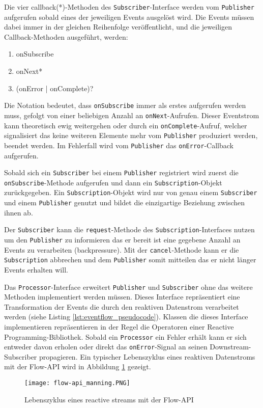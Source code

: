Die vier \gls{callback}(*)-Methoden des \verb|Subscriber|-Interface werden vom \verb|Publisher| aufgerufen sobald eines der jeweiligen Events ausgelöst wird.
Die Events müssen dabei immer in der gleichen Reihenfolge veröffentlicht, und die jeweiligen Callback-Methoden ausgeführt, werden:
\begin{enumerate}
  \item onSubscribe
  \item onNext*
  \item (onError | onComplete)?
\end{enumerate}
Die Notation bedeutet, dass \verb|onSubscribe| immer als erstes aufgerufen werden muss, gefolgt von einer beliebigen Anzahl an
\verb|onNext|-Aufrufen. Dieser Eventstrom kann theoretisch ewig weitergehen oder durch ein \verb|onComplete|-Aufruf, welcher
signalisiert das keine weiteren Elemente mehr vom \verb|Publisher| produziert werden, beendet werden.
Im Fehlerfall wird vom \verb|Publisher| das \verb|onError|-Callback aufgerufen.

Sobald sich ein \verb|Subscriber| bei einem \verb|Publisher| registriert wird zuerst die \verb|onSubscribe|-Methode aufgerufen und dann ein
\verb|Subscription|-Objekt zurückgegeben. Ein \verb|Subscription|-Objekt wird nur von genau einem \verb|Subscriber| und einem \verb|Publisher| genutzt
und bildet die einzigartige Beziehung zwischen ihnen ab.

Der \verb|Subscriber| kann die \verb|request|-Methode des \verb|Subscription|-Interfaces nutzen um den \verb|Publisher| zu informieren das er bereit
ist eine gegebene Anzahl an Events zu verarbeiten (backpressure). Mit der \verb|cancel|-Methode kann er die \verb|Subscription| abbrechen und dem \verb|Publisher|
somit mitteilen das er nicht länger Events erhalten will.
\parencite{JavaSEFlow}

Das \verb|Processor|-Interface erweitert \verb|Publisher| und \verb|Subscriber| ohne das weitere Methoden implementiert werden müssen.
Dieses Interface repräsentiert eine Transformation der Events die durch den
reaktiven Datenstrom verarbeitet werden (siehe Listing \ref{lst:eventflow_pseudocode}).
Klassen die dieses Interface implementieren repräsentieren in der Regel die Operatoren einer Reactive Programming-Bibliothek.
Sobald ein \verb|Processor| ein Fehler erhält kann er sich entweder davon erholen oder direkt das \verb|onError|-Signal an seinen
Downstream-Subscriber propagieren. Ein typischer Lebenszyklus eines reaktiven Datenstroms mit der Flow-API wird in
Abbildung \ref{fig:flow-api} gezeigt.
\begin{figure}[ht!]
  \centering
  \texttt{[image: flow-api\_manning.PNG]}
  \caption{Lebenszyklus eines reactive streams mit der Flow-API \parencite[Kapitel 17,  Figure 17.3]{JavaInAction}}
  \label{fig:flow-api}
\end{figure}
\newpage


